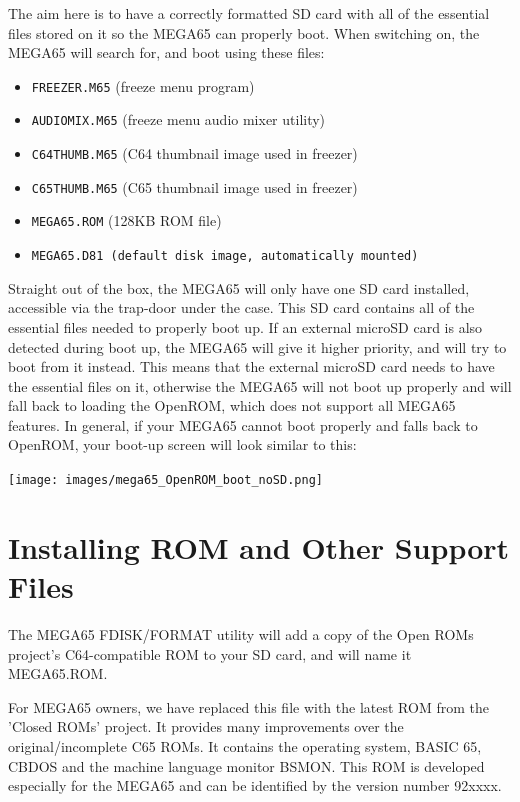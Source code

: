 The aim here is to have a correctly formatted SD card with all of the essential files stored on it so the MEGA65 can properly boot.
When switching on, the MEGA65 will search for, and boot using these files:
\begin{itemize}
\item {\tt FREEZER.M65} (freeze menu program)
\item {\tt AUDIOMIX.M65} (freeze menu audio mixer utility)
\item {\tt C64THUMB.M65} (C64 thumbnail image used in freezer)
\item {\tt C65THUMB.M65} (C65 thumbnail image used in freezer)
\item {\tt MEGA65.ROM}   (128KB ROM file)
\item {\tt MEGA65.D81 (default disk image, automatically mounted)}
\end{itemize}

Straight out of the box, the MEGA65 will only have one SD card installed, accessible via the trap-door under the case. This SD card contains all of the essential files needed to properly boot up.
If an external microSD card is also detected during boot up, the MEGA65 will give it higher priority, and will try to boot from it instead.
This means that the external microSD card needs to have the essential files on it, otherwise the MEGA65 will not boot up properly and will fall back to loading the OpenROM, which does not support all MEGA65 features.
In general, if your MEGA65 cannot boot properly and falls back to OpenROM, your boot-up screen will look similar to this:

\begin{center}
\texttt{[image: images/mega65\_OpenROM\_boot\_noSD.png]}
\end{center}


\section{Installing ROM and Other Support Files}
\label{sec:installingrometc}

The MEGA65 FDISK/FORMAT utility will add a copy of the Open ROMs project's C64-compatible ROM
to your SD card, and will name it MEGA65.ROM.

For MEGA65 owners, we have replaced this file with the latest ROM from the 'Closed ROMs'
project. It provides many improvements over the original/incomplete C65 ROMs. It contains
the operating system, BASIC 65, CBDOS and the machine language monitor BSMON.
This ROM is developed especially for the MEGA65 and can be
identified by the version number 92xxxx.

